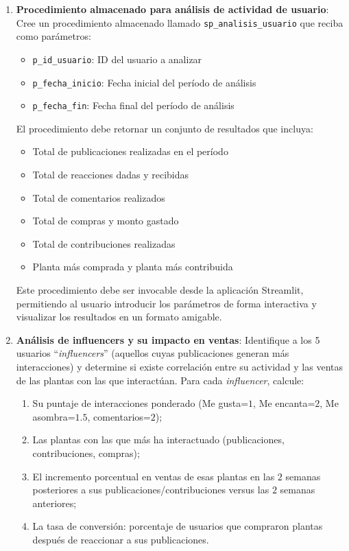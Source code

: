 \documentclass[10pt]{article}
\begin{document}
\begin{enumerate}
\begin{enumerate}
             \item \textbf{Procedimiento almacenado para análisis de actividad de usuario}: Cree un procedimiento almacenado llamado \texttt{sp\_analisis\_usuario} que reciba como parámetros:
             \begin{itemize}
             	\item \texttt{p\_id\_usuario}: ID del usuario a analizar
             	\item \texttt{p\_fecha\_inicio}: Fecha inicial del período de análisis
             	\item \texttt{p\_fecha\_fin}: Fecha final del período de análisis
             \end{itemize}
             El procedimiento debe retornar un conjunto de resultados que incluya:
             \begin{itemize}
             	\item Total de publicaciones realizadas en el período
             	\item Total de reacciones dadas y recibidas
             	\item Total de comentarios realizados
             	\item Total de compras y monto gastado
             	\item Total de contribuciones realizadas
             	\item Planta más comprada y planta más contribuida
             \end{itemize}
             Este procedimiento debe ser invocable desde la aplicación Streamlit, permitiendo al usuario introducir los parámetros de forma interactiva y visualizar los resultados en un formato amigable.
             
             \item \textbf{Análisis de influencers y su impacto en ventas}: Identifique a los 5 usuarios ``\emph{influencers}'' (aquellos cuyas publicaciones generan más interacciones) y determine si existe correlación entre su actividad y las ventas de las plantas con las que interactúan. Para cada \emph{influencer}, calcule: 
             \begin{enumerate}
				\item Su puntaje de interacciones ponderado (Me gusta=$1$, Me encanta=$2$, Me asombra=$1.5$, comentarios=$2$); 
				\item Las plantas con las que más ha interactuado (publicaciones, contribuciones, compras); 
				\item El incremento porcentual en ventas de esas plantas en las $2$ semanas posteriores a sus publicaciones/contribuciones versus las $2$ semanas anteriores; 
				\item La tasa de conversión: porcentaje de usuarios que compraron plantas después de reaccionar a sus publicaciones.
             \end{enumerate}
             

\end{enumerate}
\end{enumerate}
\end{document}
